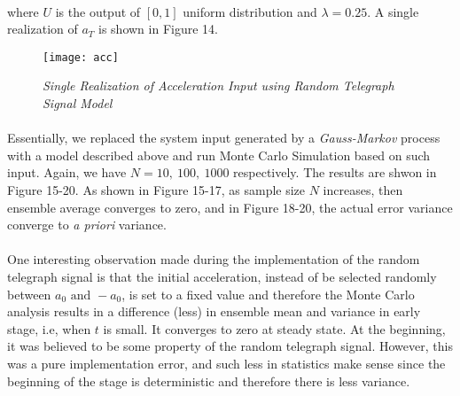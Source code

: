 \paragraph{}
where $U$ is the output of $[0,1]$ uniform distribution and $\lambda = 0.25$. A single realization of $a_T$ is shown in Figure 14.
\begin{figure}[H]
	\centering
	\texttt{[image: acc]}
	\caption{\textit{Single Realization of Acceleration Input using Random Telegraph Signal Model}}
\end{figure}
\paragraph{}
Essentially, we replaced the system input generated by a \textit{Gauss-Markov} process with a model described above and run Monte Carlo Simulation based on such input. Again, we have $N = 10,\ 100,\ 1000$ respectively. The results are shwon in Figure 15-20. As shown in Figure 15-17, as sample size $N$ increases, then ensemble average converges to zero, and in Figure 18-20, the actual error variance converge to \textit{a priori} variance.
\vspace{-12pt}
\paragraph{}
One interesting observation made during the implementation of the random telegraph signal is that the initial acceleration, instead of be selected randomly between $a_0 \text{ and } -a_0$, is set to a fixed value and therefore the Monte Carlo analysis results in a difference (less) in ensemble mean and variance in early stage, i.e, when $t$ is small. It converges to zero at steady state. At the beginning, it was believed to be some property of the random telegraph signal. However, this was a pure implementation error, and such less in statistics make sense since the beginning of the stage is deterministic and therefore there is less variance.

